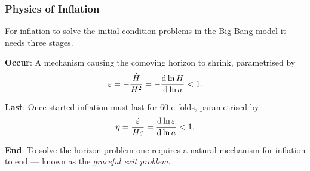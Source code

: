 \subsubsection{Physics of Inflation}

For inflation to solve the initial condition problems in the Big Bang model it needs three stages.

\begin{hangparas}{24pt}{1}
	\textbf{Occur}:
	A mechanism causing the comoving horizon to shrink, parametrised by
	\begin{equation}
		\varepsilon
		= -\frac{\dot{H}}{H^{2}}
		= -\dv{\ln{H}}{\ln{a}}
		< 1.
	\end{equation}

	\textbf{Last}:
	Once started inflation must last for 60 e-folds, parametrised by
	\begin{equation}
		\eta
		= \frac{\dot{\varepsilon}}{H\varepsilon}
		= \dv{\ln{\varepsilon}}{\ln{a}}
		< 1.
	\end{equation}

	\textbf{End}:
	To solve the horizon problem one requires a natural mechanism for inflation to end --- known as the \emph{graceful exit problem}.
\end{hangparas}

